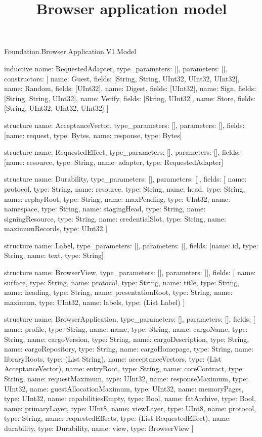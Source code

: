 \begin{lexlean}{Foundation.Browser.Application.V1.Model}
\title{Browser application model}
\begin{semanticmodule}
inductive{
  name: RequestedAdapter,
  type_parameters: [],
  parameters: [],
  constructors: [
    {name: Guest, fields: [String, String, UInt32, UInt32, UInt32]},
    {name: Random, fields: [UInt32]},
    {name: Digest, fields: [UInt32]},
    {name: Sign, fields: [String, String, UInt32]},
    {name: Verify, fields: [String, UInt32]},
    {name: Store, fields: [String, UInt32, UInt32, UInt32]}
  ]
}

structure{
  name: AcceptanceVector,
  type_parameters: [],
  parameters: [],
  fields: [{name: request, type: Bytes}, {name: response, type: Bytes}]
}

structure{
  name: RequestedEffect,
  type_parameters: [],
  parameters: [],
  fields: [{name: resource, type: String}, {name: adapter, type: RequestedAdapter}]
}

structure{
  name: Durability,
  type_parameters: [],
  parameters: [],
  fields: [
    {name: protocol, type: String},
    {name: resource, type: String},
    {name: head, type: String},
    {name: replayRoot, type: String},
    {name: maxPending, type: UInt32},
    {name: namespace, type: String},
    {name: stagingHead, type: String},
    {name: signingResource, type: String},
    {name: credentialSlot, type: String},
    {name: maximumRecords, type: UInt32}
  ]
}

structure{
  name: Label,
  type_parameters: [],
  parameters: [],
  fields: [{name: id, type: String}, {name: text, type: String}]
}

structure{
  name: BrowserView,
  type_parameters: [],
  parameters: [],
  fields: [
    {name: surface, type: String},
    {name: protocol, type: String},
    {name: title, type: String},
    {name: heading, type: String},
    {name: presentationRoot, type: String},
    {name: maximum, type: UInt32},
    {name: labels, type: (List Label)}
  ]
}

structure{
  name: BrowserApplication,
  type_parameters: [],
  parameters: [],
  fields: [
    {name: profile, type: String},
    {name: name, type: String},
    {name: cargoName, type: String},
    {name: cargoVersion, type: String},
    {name: cargoDescription, type: String},
    {name: cargoRepository, type: String},
    {name: cargoHomepage, type: String},
    {name: libraryRoots, type: (List String)},
    {name: acceptanceVectors, type: (List AcceptanceVector)},
    {name: entryRoot, type: String},
    {name: coreContract, type: String},
    {name: requestMaximum, type: UInt32},
    {name: responseMaximum, type: UInt32},
    {name: guestAllocationMaximum, type: UInt32},
    {name: memoryPages, type: UInt32},
    {name: capabilitiesEmpty, type: Bool},
    {name: fatArchive, type: Bool},
    {name: primaryLayer, type: UInt8},
    {name: viewLayer, type: UInt8},
    {name: protocol, type: String},
    {name: requestedEffects, type: (List RequestedEffect)},
    {name: durability, type: Durability},
    {name: view, type: BrowserView}
  ]
}
\end{semanticmodule}
\end{lexlean}
